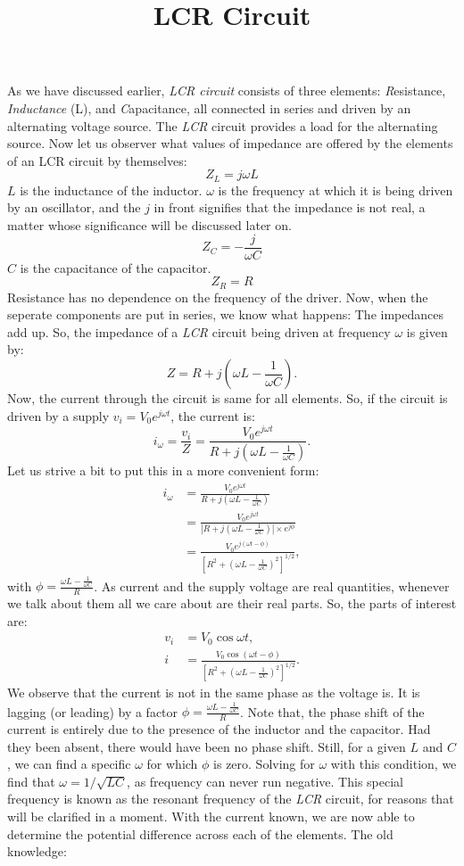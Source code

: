 \documentclass[12pt]{article}
\title{LCR Circuit}
\begin{document}
\maketitle
As we have discussed earlier, \emph{LCR circuit} consists of three elements: \emph{R}esistance, \emph{Inductance} (L), and \emph{C}apacitance, all connected in series and driven by an alternating voltage source. The \emph{LCR} circuit provides a load for the alternating source. Now let us observer what values of impedance are offered by the elements of an LCR circuit by themselves: \\
$$Z_L=j\omega L$$
$L$ is the inductance of the inductor. $\omega$ is the frequency at which it is being driven by an oscillator, and the $j$ in front signifies that the impedance is not real, a matter whose significance will be discussed later on.
$$Z_C=-\frac{j}{\omega C}$$
$C$ is the capacitance of the capacitor.
$$Z_R=R$$
Resistance has no dependence on the frequency of the driver.
Now, when the seperate components are put in series, we know what happens: The impedances add up. So, the impedance of a \emph{LCR} circuit being driven at frequency $\omega$ is given by:
$$
Z=R+j\left(\omega L - \frac{1}{\omega C} \right).
$$
Now, the current through the circuit is same for all elements. So, if the circuit is driven by a supply $v_i=V_0 e^{j \omega t}$, the current is:
$$
i_\omega =\frac{v_i}{Z}=\frac{V_0 e^{j \omega t}}{R+j\left(\omega L - \frac{1}{\omega C} \right)}.
$$
Let us strive a bit to put this in a more convenient form:
$$
\begin{aligned}
i_\omega &=\frac{V_0 e^{j \omega t}}{R+j\left(\omega L - \frac{1}{\omega C} \right)} \\
&=\frac{V_0 e^{j \omega t}}{\left|R+j\left(\omega L - \frac{1}{\omega C} \right)\right|\times e^{j\phi}} \\
&=\frac{V_0 e^{j (\omega t - \phi)}}{\left[R^2+\left(\omega L - \frac{1}{\omega C} \right)^2\right]^{1/2}},
\end{aligned}
$$
with $\phi=\frac{\omega L - \frac{1}{\omega C}}{R}$.
As current and the supply voltage are real quantities, whenever we talk about them all we care about are their real parts. So, the parts of interest are:
$$
\begin{aligned}
v_i &=V_0 \cos \omega t, \\
i &=\frac{V_0 \cos(\omega t - \phi)}{\left[R^2+\left(\omega L - \frac{1}{\omega C} \right)^2\right]^{1/2}}.
\end{aligned}
$$
We observe that the current is not in the same phase as the voltage is. It is lagging (or leading) by a factor $\phi=\frac{\omega L - \frac{1}{\omega C}}{R}$. Note that, the phase shift of the current is entirely due to the presence of the inductor and the capacitor. Had they been absent, there would have been no phase shift. Still, for a given $L$ and $C$, we can find a specific $\omega$ for which $\phi$ is zero. Solving for $\omega$ with this condition, we find that $\omega=1/\sqrt{LC}$, as frequency can never run negative. This special frequency is known as the resonant frequency of the \emph{LCR} circuit, for reasons that will be clarified in a moment. With the current known, we are now able to determine the potential difference across each of the elements. The old knowledge:
\end{document}
